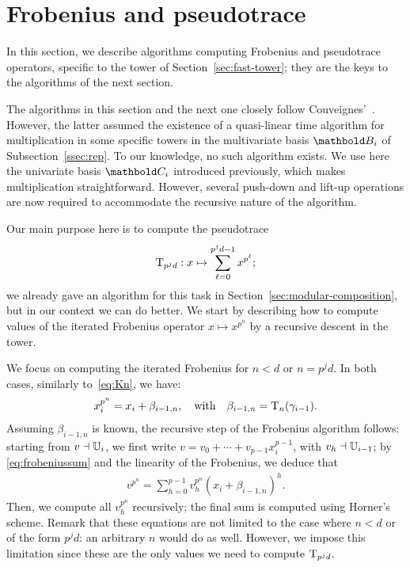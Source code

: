 

\section{Frobenius and pseudotrace}
\label{sec:pseudotrace-frobenius}

In this section, we describe algorithms computing Frobenius
and pseudotrace operators, specific to the tower of
Section~\ref{sec:fast-tower}; they are the keys to the algorithms of
the next section.

The algorithms in this section and the next one closely follow
Couveignes'~\cite{couveignes00}. However, the latter assumed the
existence of a quasi-linear time algorithm for multiplication in some
specific towers in the multivariate basis $\basis{B}_i$ of
Subsection~\ref{ssec:rep}. To our knowledge, no such algorithm
exists. We use here the univariate basis $\basis{C}_i$ introduced
previously, which makes multiplication straightforward. However,
several push-down and lift-up operations are now required to
accommodate the recursive nature of the algorithm.

Our main purpose here is to compute the pseudotrace
\begin{equation}
  \operatorname{T}_{p^jd}:x\mapsto\sum_{\ell=0}^{p^jd-1}x^{p^{\ell}}
  \text{;}  
\end{equation}
we already gave an algorithm for this task in
Section~\ref{sec:modular-composition}, but in our context we can do
better. We start by describing how to compute values of the iterated
Frobenius operator $x \mapsto x^{p^n}$ by a recursive descent in the
tower.

We focus on computing the iterated Frobenius for $n<d$ or $n=p^jd$. In
both cases, similarly to~\eqref{eq:Kn}, we have:
\begin{gather}
  \label{eq:frobeniussum}
  x_i^{p^{n}} = x_i + \beta_{i-1,n}, \quad\text{with}\quad \beta_{i-1,n}=\operatorname{T}_{n}(\gamma_{i-1}).
\end{gather}
Assuming $\beta_{i-1,n}$ is known, the recursive step of the Frobenius
algorithm follows: starting from $v\dashv\mathbb{U}_i$, we first write
$v=v_0+\cdots+v_{p-1}x_i^{p-1}$, with $v_h\dashv\mathbb{U}_{i-1}$; by
\eqref{eq:frobeniussum} and the linearity of the Frobenius, we deduce
that
\begin{equation}
  \label{eq:frobeniuscomp}
\begin{array}{c}
v^{p^n}
  =\sum_{h=0}^{p-1} v_h^{p^n} \left(x_i + \beta_{i-1,n}\right)^{h}.
\end{array}
\end{equation}
Then, we compute all $v_h^{p^n}$ recursively; the final sum is
computed using Horner's scheme. Remark that these equations are not
limited to the case where $n<d$ or of the form $p^jd$: an arbitrary
$n$ would do as well. However, we impose this limitation since these
are the only values we need to compute $\operatorname{T}_{p^jd}$.

